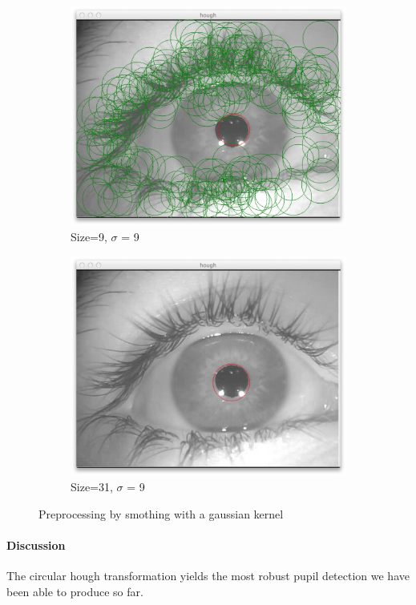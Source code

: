 \documentclass[a4paper,11pt]{article}
\begin{document}
\begin{figure}[H]
\centering
\begin{subfigure}{.5\textwidth}
  \centering
  \includegraphics[width=.8\linewidth]{houghk9s9}
  \caption{Size=9, $\sigma$ = 9}
  \label{fig:sub3}
\end{subfigure}%
\begin{subfigure}{.5\textwidth}
  \centering
  \includegraphics[width=.8\linewidth]{houghk31s9}
  \caption{Size=31, $\sigma$ = 9}
  \label{fig:sub4}
\end{subfigure}
\caption{Preprocessing by smothing with a gaussian kernel}
\label{fig:test2}
\end{figure}

\paragraph{Discussion}
The circular hough transformation yields the most robust pupil detection we have been able to produce so far.
\end{document}
